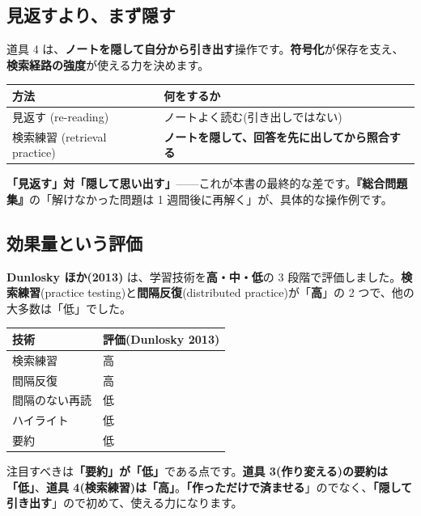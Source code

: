 \documentclass{article}
\begin{document}
\subsection{見返すより、まず隠す}

道具 4 は、\textbf{ノートを隠して自分から引き出す}操作です。\textbf{符号化}が保存を支え、\textbf{検索経路の強度}が使える力を決めます。

\begin{center}
\begin{tabular}{|l|l|}
\hline
方法 & 何をするか \\
\hline
見返す (re-reading) & ノートよく読む(引き出しではない) \\
\hline
検索練習 (retrieval practice) & \textbf{ノートを隠して、回答を先に出してから照合する} \\
\hline
\end{tabular}
\end{center}

\textbf{「見返す」対「隠して思い出す」}——これが本書の最終的な差です。\textbf{『総合問題集』}の「解けなかった問題は 1 週間後に再解く」が、具体的な操作例です。

\subsection{効果量という評価}

\textbf{Dunlosky ほか(2013)} は、学習技術を\textbf{高・中・低}の 3 段階で評価しました。\textbf{検索練習}(practice testing)と\textbf{間隔反復}(distributed practice)が「\textbf{高}」の 2 つで、他の大多数は「低」でした。

\begin{center}
\begin{tabular}{|l|l|}
\hline
技術 & 評価(Dunlosky 2013) \\
\hline
検索練習 & 高 \\
\hline
間隔反復 & 高 \\
\hline
間隔のない再読 & 低 \\
\hline
ハイライト & 低 \\
\hline
要約 & 低 \\
\hline
\end{tabular}
\end{center}

注目すべきは\textbf{「要約」が「低」}である点です。\textbf{道具 3(作り変える)の要約は「低」}、\textbf{道具 4(検索練習)は「高」}。\textbf{「作っただけで済ませる}」のでなく、\textbf{「隠して引き出す}」ので初めて、使える力になります。
\end{document}
